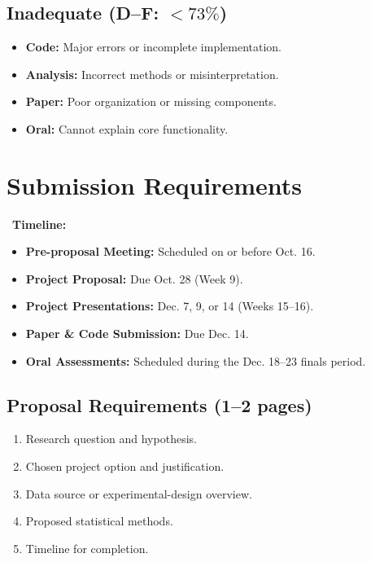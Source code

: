 \documentclass[10pt,letterpaper]{article}
\begin{document}
\subsection{Inadequate (D--F: \texorpdfstring{$<73\%$}{<73\%})}
\begin{redbox}
\begin{itemize}
  \item \textbf{Code:} Major errors or incomplete implementation.
  \item \textbf{Analysis:} Incorrect methods or misinterpretation.
  \item \textbf{Paper:} Poor organization or missing components.
  \item \textbf{Oral:} Cannot explain core functionality.
\end{itemize}
\end{redbox}

\section{Submission Requirements}

\begin{goldbox}
\faCalendar\ \textbf{Timeline:}
\begin{itemize}
  \item \textbf{Pre-proposal Meeting:} Scheduled on or before Oct. 16.
  \item \textbf{Project Proposal:} Due Oct. 28 (Week 9).
  \item \textbf{Project Presentations:} Dec. 7, 9, or 14 (Weeks 15--16).
  \item \textbf{Paper \& Code Submission:} Due Dec. 14.
  \item \textbf{Oral Assessments:} Scheduled during the Dec. 18--23 finals period.
\end{itemize}
\end{goldbox}

\subsection{Proposal Requirements (1--2 pages)}
\begin{enumerate}
  \item Research question and hypothesis.
  \item Chosen project option and justification.
  \item Data source or experimental-design overview.
  \item Proposed statistical methods.
  \item Timeline for completion.
\end{enumerate}
\end{document}
